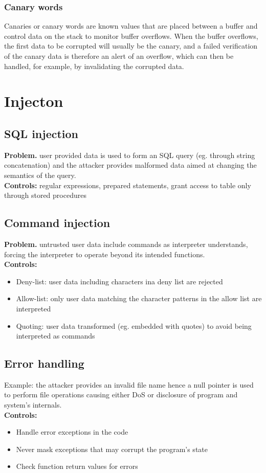 \documentclass[10pt,a4paper]{book}
\begin{document}
\subsection{Canary words}
Canaries or canary words are known values that are placed between a buffer and control data on the stack to monitor buffer overflows. When the buffer overflows, the first data to be corrupted will usually be the canary, and a failed verification of the canary data is therefore an alert of an overflow, which can then be handled, for example, by invalidating the corrupted data.
\chapter{Injecton}
\section{SQL injection}
\textbf{Problem.} user provided data is used to form an SQL query (eg. through string concatenation) and the attacker provides malformed data aimed at changing the semantics of the query.\\
\textbf{Controls:} regular expressions, prepared statements, grant access to table only through stored procedures
\section{Command injection}
\textbf{Problem.} untrusted user data include commands as interpreter understands, forcing the interpreter to operate beyond its intended functions.\\
\textbf{Controls:}
\begin{itemize}
\item Deny-list: user data including characters ina deny list are rejected
\item Allow-list: only user data matching the character patterns in the allow list are interpreted
\item Quoting: user data transformed (eg. embedded with quotes) to avoid being interpreted as commands
\end{itemize}
\section{Error handling}
Example: the attacker provides an invalid file name hence a null pointer is used to perform file operations causing either DoS or disclosure of program and system's internals.\\
\textbf{Controls:}
\begin{itemize}
\item Handle error exceptions in the code
\item Never mask exceptions that may corrupt the program's state
\item Check function return values for errors
\end{itemize}
\end{document}
